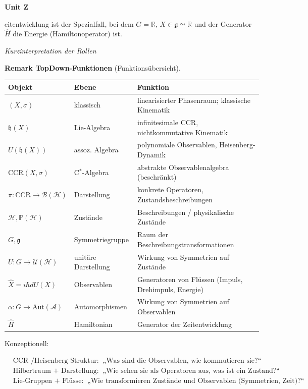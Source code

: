 \documentclass[10pt, letterpaper]{article}
\newcommand{\R}{\mathbb{R}}
\newcommand{\CustomHeading}[3]{%
  \par\medskip\noindent%
  \textbf{#1 #2} \textnormal{(#3)}.\enskip%
}
\newenvironment{REM}[2]{\begin{unitbox}\CustomHeading{Remark}{#1}{#2}}{\end{unitbox}}
\newenvironment{unit}[1]
  {\begin{unitbox}\textbf{Unit #1}\par\smallskip}
  {\end{unitbox}}
\begin{document}
\begin{unit}
Zeitentwicklung ist der Spezialfall, bei dem \(G=\R\), \(X\in\mathfrak g\simeq\R\)
und der Generator \(\hat H\) die Energie (Hamiltonoperator) ist.

\emph{Kurzinterpretation der Rollen}

\begin{REM}{TopDown-Funktionen}{Funktionsübersicht}
\begin{center}
\renewcommand{\arraystretch}{1.25}
\begin{tabular}{lll}
\textbf{Objekt} & \textbf{Ebene} & \textbf{Funktion} \\ \hline
\((X,\sigma)\) & klassisch & linearisierter Phasenraum; klassische Kinematik \\
\(\mathfrak{h}(X)\) & Lie-Algebra & infinitesimale CCR, nichtkommutative Kinematik \\
\(U(\mathfrak{h}(X))\) & assoz. Algebra & polynomiale Observablen, Heisenberg-Dynamik \\
\(\mathrm{CCR}(X,\sigma)\) & C$^\ast$-Algebra & abstrakte Observablenalgebra (beschränkt) \\
\(\pi:\mathrm{CCR}\to\mathcal{B}(\mathcal{H})\) & Darstellung & konkrete Operatoren, Zustandsbeschreibungen \\
\(\mathcal{H},\mathbb{P}(\mathcal{H})\) & Zustände & Beschreibungen / physikalische Zustände \\
\(G,\mathfrak g\) & Symmetriegruppe & Raum der Beschreibungstransformationen \\
\(U:G\to\mathcal{U}(\mathcal{H})\) & unitäre Darstellung & Wirkung von Symmetrien auf Zustände \\
\(\hat X=i\hbar dU(X)\) & Observablen & Generatoren von Flüssen (Impuls, Drehimpuls, Energie) \\
\(\alpha:G\to\mathrm{Aut}(\mathcal{A})\) & Automorphismen & Wirkung von Symmetrien auf Observablen \\
\(\hat H\) & Hamiltonian & Generator der Zeitentwicklung
\end{tabular}
\end{center}

Konzeptionell:

\[
\boxed{
\begin{aligned}
&\text{CCR-/Heisenberg-Struktur:}\;\;\text{„Was sind die Observablen, wie kommutieren sie?“}\\
&\text{Hilbertraum + Darstellung:}\;\;\text{„Wie sehen sie als Operatoren aus, was ist ein Zustand?“}\\
&\text{Lie-Gruppen + Flüsse:}\;\;\text{„Wie transformieren Zustände und Observablen (Symmetrien, Zeit)?“}
\end{aligned}
}
\]
\end{REM}


\end{unit}
\end{document}
